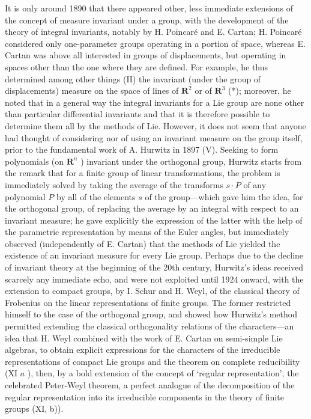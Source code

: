 It is only around 1890 that there appeared other, less immediate extensions of the concept of measure invariant under a group, with the development of the theory of integral invariants, notably by H. Poincaré and E. Cartan; H. Poincaré considered only one-parameter groups operating in a portion of space, whereas E. Cartan was above all interested in groups of displacements, but operating in spaces other than the one where they are defined. For example, he thus determined among other things (II) the invariant (under the group of displacements) measure on the space of lines of \(\mathbf{R}^2\) or of \(\mathbf{R}^3\) (*); moreover, he noted that in a general way the integral invariants for a Lie group are none other than particular differential invariants and that it is therefore possible to determine them all by the methods of Lie. However, it does not seem that anyone had thought of considering nor of using an invariant measure on the group itself, prior to the fundamental work of A. Hurwitz in 1897 (V). Seeking to form polynomials (on \(\mathbf{R}^n\) ) invariant under the orthogonal group, Hurwitz starts from the remark that for a finite group of linear transformations, the problem is immediately solved by taking the average of the transforms \(s \cdot P\) of any polynomial \(P\) by all of the elements \(s\) of the group---which gave him the idea, for the orthogonal group, of replacing the average by an integral with respect to an invariant measure; he gave explicitly the expression of the latter with the help of the parametric representation by means of the Euler angles, but immediately observed (independently of E. Cartan) that the methods of Lie yielded the existence of an invariant measure for every Lie group. Perhaps due to the decline of invariant theory at the beginning of the 20th century, Hurwitz's ideas received scarcely any immediate echo, and were not exploited until 1924 onward, with the extension to compact groups, by I. Schur and H. Weyl, of the classical theory of Frobenius on the linear representations of finite groups. The former restricted himself to the case of the orthogonal group, and showed how Hurwitz's method permitted extending the classical orthogonality relations of the characters---an idea that H. Weyl combined with the work of E. Cartan on semi-simple Lie algebras, to obtain explicit expressions for the characters of the irreducible representations of compact Lie groups and the theorem on complete reducibility (XI \(a\) ), then, by a bold extension of the concept of `regular representation', the celebrated Peter-Weyl theorem, a perfect analogue of the decomposition of the regular representation into its irreducible components in the theory of finite groups (XI, b)).

